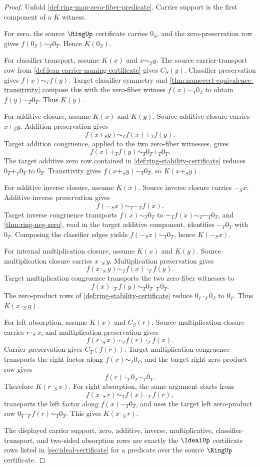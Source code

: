 \begin{proof}
Unfold \autoref{def:ring-map-zero-fiber-predicate}. Carrier support is the first component of a $K$ witness.

For zero, the source $\RingUp$ certificate carries $0_S$, and the zero-preservation row gives $f(0_S)\sim_T0_T$. Hence $K(0_S)$.

For classifier transport, assume $K(x)$ and $x\sim_S y$. The source carrier-transport row from \autoref{def:lean-carrier-naming-certificate} gives $C_S(y)$. Classifier preservation gives $f(x)\sim_T f(y)$. Target classifier symmetry and \autoref{thm:namecert-equivalence-transitivity} compose this with the zero-fiber witness $f(x)\sim_T0_T$ to obtain $f(y)\sim_T0_T$. Thus $K(y)$.

For additive closure, assume $K(x)$ and $K(y)$. Source additive closure carries $x+_S y$. Addition preservation gives
$$
f(x+_S y)\sim_T f(x)+_T f(y).
$$
Target addition congruence, applied to the two zero-fiber witnesses, gives
$$
f(x)+_T f(y)\sim_T0_T+_T0_T.
$$
The target additive zero row contained in \autoref{def:ring-stability-certificate} reduces $0_T+_T0_T$ to $0_T$. Transitivity gives $f(x+_S y)\sim_T0_T$, so $K(x+_S y)$.

For additive inverse closure, assume $K(x)$. Source inverse closure carries $-_S x$. Additive-inverse preservation gives
$$
f(-_S x)\sim_T -_T f(x).
$$
Target inverse congruence transports $f(x)\sim_T0_T$ to $-_T f(x)\sim_T -_T0_T$, and \autoref{thm:ring-neg-zero}, read in the target additive component, identifies $-_T0_T$ with $0_T$. Composing the classifier edges yields $f(-_S x)\sim_T0_T$, hence $K(-_S x)$.

For internal multiplication closure, assume $K(x)$ and $K(y)$. Source multiplication closure carries $x\cdot_S y$. Multiplication preservation gives
$$
f(x\cdot_S y)\sim_T f(x)\cdot_T f(y).
$$
Target multiplication congruence transports the two zero-fiber witnesses to
$$
f(x)\cdot_T f(y)\sim_T0_T\cdot_T0_T.
$$
The zero-product rows of \autoref{def:ring-stability-certificate} reduce $0_T\cdot_T0_T$ to $0_T$. Thus $K(x\cdot_S y)$.

For left absorption, assume $K(x)$ and $C_S(r)$. Source multiplication closure carries $r\cdot_S x$, and multiplication preservation gives
$$
f(r\cdot_S x)\sim_T f(r)\cdot_T f(x).
$$
Carrier preservation gives $C_T(f(r))$. Target multiplication congruence transports the right factor along $f(x)\sim_T0_T$, and the target right zero-product row gives
$$
f(r)\cdot_T0_T\sim_T0_T.
$$
Therefore $K(r\cdot_S x)$. For right absorption, the same argument starts from
$$
f(x\cdot_S r)\sim_T f(x)\cdot_T f(r),
$$
transports the left factor along $f(x)\sim_T0_T$, and uses the target left zero-product row $0_T\cdot_T f(r)\sim_T0_T$. This gives $K(x\cdot_S r)$.

The displayed carrier support, zero, additive, inverse, multiplicative, classifier-transport, and two-sided absorption rows are exactly the $\IdealUp$ certificate rows listed in \autoref{sec:ideal-certificate} for a predicate over the source $\RingUp$ certificate.
\end{proof}

